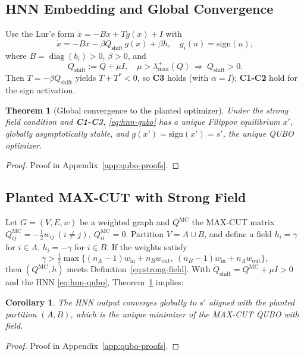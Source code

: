 \documentclass[journal]{IEEEtran}
\theoremstyle{myplain}
\newtheorem{theorem}{Theorem}
\newtheorem{corollary}{Corollary}
\begin{document}
\subsection{HNN Embedding and Global Convergence}
Use the Lur’e form \(\dot x=-Bx+Tg(x)+I\) with
\begin{equation}\label{eq:hnn-qubo}
  \dot x = -B x - \beta Q_{\mathrm{shift}}\, g(x) + \beta h,\quad
  g_i(u)=\mathrm{sign}(u),
\end{equation}
where \(B=\operatorname{diag}(b_i)>0\), \(\beta>0\), and
\begin{equation}\label{eq:Qshift}
  Q_{\mathrm{shift}}:=Q+\mu I,\quad \mu>\lambda^+_{\max}(Q)\ \Rightarrow\ Q_{\mathrm{shift}}>0.
\end{equation}
Then \(T=-\beta Q_{\mathrm{shift}}\) yields \(T+T^*<0\), so \textbf{C3} holds (with \(\alpha=I\)); \textbf{C1-C2} hold for the sign activation.
\begin{theorem}[Global convergence to the planted optimizer]\label{th:hnn-solves-strong-field-qubo}
Under the strong field condition and \textbf{C1-C3}, \eqref{eq:hnn-qubo} has a unique Filippov equilibrium \(x'\), globally asymptotically stable, and \(g(x')=\mathrm{sign}(x')=s'\), the unique QUBO optimizer. 
\end{theorem}
\begin{proof}
  Proof in Appendix~\ref{app:qubo-proofs}.
\end{proof}

\subsection{Planted MAX-CUT with Strong Field}\label{subsec:planted-maxcut}
Let \(G=(V,E,w)\) be a weighted graph and \(Q^{\mathrm{MC}}\) the MAX-CUT matrix
\(
Q^{\mathrm{MC}}_{ij}=-\tfrac12 w_{ij}\ (i\ne j),\ Q^{\mathrm{MC}}_{ii}=0.
\)
Partition \(V=A\cup B\), and define a field \(h_i=\gamma\) for \(i\in A\), \(h_i=-\gamma\) for \(i\in B\).
If the weights satisfy
\begin{equation}\label{eq:gamma-condition}
  \gamma>\tfrac12\max\!\big\{(n_A-1)w_{\mathrm{in}}\!+\!n_B w_{\mathrm{out}},\ (n_B-1)w_{\mathrm{in}}\!+\!n_A w_{\mathrm{out}}\big\},
\end{equation}
then \((Q^{\mathrm{MC}},h)\) meets Definition~\ref{eq:strong-field}. With \(Q_{\mathrm{shift}}=Q^{\mathrm{MC}}+\mu I>0\) and the HNN \eqref{eq:hnn-qubo}, Theorem~\ref{th:hnn-solves-strong-field-qubo} implies:
\begin{corollary}\label{cor:hnn-planted-maxcut}
The HNN output converges globally to \(s'\) aligned with the planted partition \((A,B)\), which is the unique minimizer of the MAX-CUT QUBO with field.
\end{corollary}
\begin{proof}
  Proof in Appendix~\ref{app:qubo-proofs}.
\end{proof}
\end{document}
